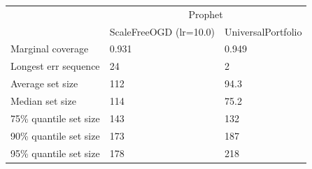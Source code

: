 \begin{tabular}{lll}
\toprule
& \multicolumn{2}{c}{Prophet} \\
& ScaleFreeOGD (lr=10.0) & UniversalPortfolio \\
\midrule
Marginal coverage & 0.931 & 0.949 \\
Longest err sequence & 24 & 2 \\
Average set size & 112 & 94.3 \\
Median set size & 114 & 75.2 \\
75\% quantile set size & 143 & 132 \\
90\% quantile set size & 173 & 187 \\
95\% quantile set size & 178 & 218 \\
\bottomrule
\end{tabular}
